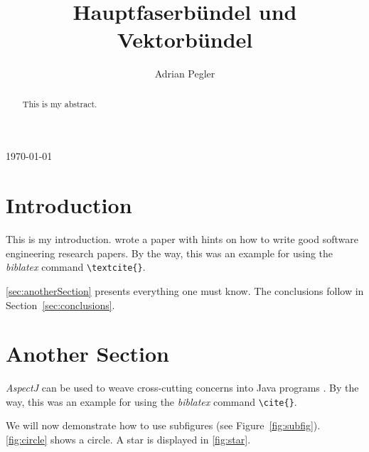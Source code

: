 \documentclass{llncs}
\title{Hauptfaserbündel und Vektorbündel}
\author{Adrian Pegler}
\institute{Christian-Albrechts-Universität zu Kiel\\Arbeitsgruppe Geometrie\\24098 Kiel}
\begin{document}
\maketitle
\begin{center}
	\today
\end{center}

\begin{abstract}
  This is my abstract.
\end{abstract}

\section{Introduction}

  This is my introduction. \textcite{Shaw2003WritingGoodSoftwareEngineeringResearchPapersMinitutorial} wrote a paper with hints on how to write good software engineering research papers. By the way, this was an example for using the \textit{biblatex} command \texttt{\textbackslash{}textcite\{\}}.

  \autoref{sec:anotherSection} presents everything one must know. 
  The conclusions follow in Section~\ref{sec:conclusions}.

\section{Another Section}\label{sec:anotherSection}

  \textit{AspectJ} can be used to weave cross-cutting concerns into Java programs \cite{AspectJ2007}. 
  By the way, this was an example for using the \textit{biblatex} command \texttt{\textbackslash{}cite\{\}}.

  We will now demonstrate how to use subfigures (see Figure~\ref{fig:subfig}). \autoref{fig:circle} shows a circle.
  A star is displayed in \autoref{fig:star}.
\end{document}
